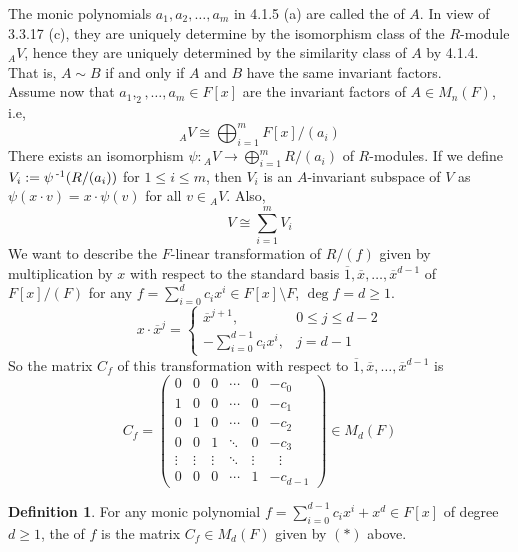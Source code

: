 \documentclass[11pt]{book}
\theoremstyle{definition}   \newtheorem{defn}[counter]{Definition} %
\newcommand{\ov}{\overline}   \newcommand{\wt}{\widetilde}
\newcommand{\bs}{\setminus}   \newcommand{\A}{\mathcal{A}}   \newcommand{\sy}{\textnormal{Syl}}   \newcommand{\size}[1]{\left| #1 \right|}
\newcommand{\mymatrix}[2]{\left( \begin{array}{#1} #2 \end{array} \right)}
\DeclareMathOperator{\ra}{\rightarrow}   \DeclareMathOperator{\Poly}{\mathbf{P}}   \DeclareMathOperator{\spn}{\textnormal{span}}   \DeclareMathOperator{\aut}{\textnormal{Aut}}
\newcommand{\vs}{\vspace{8pt}}
\numberwithin{counter}{chapter}
\begin{document}
\vs

\begin{remark}[+ Definition]
The monic polynomials $a_1,a_2,\dots,a_m$ in 4.1.5 (a) are called the  of $A$. In view of 3.3.17 (c), they are uniquely determine by the isomorphism class of the $R$-module $_AV$, hence they are uniquely determined by the similarity class of $A$ by 4.1.4. That is, $A \sim B$ if and only if $A$ and $B$ have the same invariant factors. \\

Assume now that $a_1,_2,\dots,a_m \in F[x]$ are the invariant factors of $A \in M_n(F)$, i.e,
	\[_AV \cong \bigoplus_{i=1}^m F[x]/(a_i) \]
There exists an isomorphism $\psi : {_AV} \ra \bigoplus_{i=1}^m R/(a_i)$ of $R$-modules. If we define $V_i := \psi\operatorname{^{-1}}(R/(a_i))$ for $1 \leq i \leq m$, then $V_i$ is an $A$-invariant subspace of $V$ as $\psi(x \cdot v) = x \cdot \psi(v)$ for all $v \in {_AV}$. Also,
	\[V \cong \sum_{i=1}^m V_i \]
We want to describe the $F$-linear transformation of $R/(f)$ given by multiplication by $x$ with respect to the standard basis $\ov{1},\ov{x},\dots,\ov{x}^{d-1}$ of $F[x]/(F)$ for any $f = \sum_{i=0}^d c_i x^i \in F[x]\bs F$, $\deg f = d \geq 1$. 
	\[x \cdot \ov{x}^j = \begin{cases}
	\ov{x}^{j+1}, \quad & 0 \leq j \leq d-2 \\
	-\sum_{i=0}^{d-1} c_i x^i, & j = d-1
	\end{cases} \]
So the matrix $C_f$ of this transformation with respect to $\ov{1},\ov{x},\dots,\ov{x}^{d-1}$ is
	\[C_f = \mymatrix{cccccl}{0 & 0 & 0 & \cdots & 0 & -c_0 \\
							  1 & 0 & 0 & \cdots & 0 & -c_1 \\
							  0 & 1 & 0 & \cdots & 0 & -c_2 \\
							  0 & 0 & 1 & \ddots & 0 & -c_3 \\
							  \vdots & \vdots & \vdots & \ddots & \vdots & \ \ \ \vdots \\
							  0 & 0 & 0 & \cdots & 1 & -c_{d-1}} \in M_d(F) \tag{$\ast$}\]
\end{remark}

\vs

\begin{defn}
For any monic polynomial $f = \sum_{i=0}^{d-1} c_i x^i + x^d \in F[x]$ of degree $d \geq 1$, the  of $f$ is the matrix $C_f \in M_d(F)$ given by $(\ast)$ above. 
\end{defn}

\vs
\end{document}

